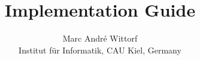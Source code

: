 \documentclass[12pt,a4paper]{article}
\author{Marc André Wittorf\\[1ex]
{\small Institut f\"ur Informatik, CAU Kiel, Germany}}
\title{Implementation Guide}
\begin{document}
\maketitle
\tableofcontents

\newpage\noindent

\end{document}
